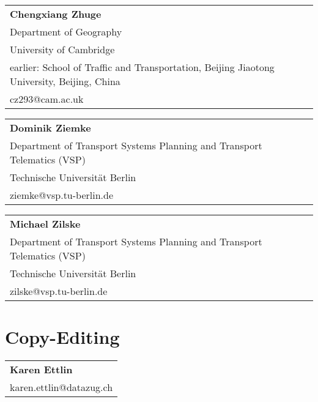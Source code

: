 \begin{tabular}[width=0.48\textwidth]{@{}l}
\textbf{Chengxiang Zhuge} \\
Department of Geography \\
University of Cambridge\\
earlier: School of Traffic and Transportation, Beijing Jiaotong University, Beijing, China \\
cz293@cam.ac.uk \\
\end{tabular}

\begin{tabular}[width=0.48\textwidth]{@{}l}
\textbf{Dominik Ziemke} \\
Department of Transport Systems Planning and Transport Telematics (VSP) \\
Technische Universität Berlin \\
ziemke@vsp.tu-berlin.de \\
\end{tabular}

\begin{tabular}[width=0.48\textwidth]{@{}l}
\textbf{Michael Zilske} \\
Department of Transport Systems Planning and Transport Telematics (VSP) \\
Technische Universität Berlin \\
zilske@vsp.tu-berlin.de \\
\end{tabular}

\section*{Copy-Editing}

\begin{tabular}[width=0.48\textwidth]{@{}l}
\textbf{Karen Ettlin} \\
karen.ettlin@datazug.ch \\
\end{tabular}



